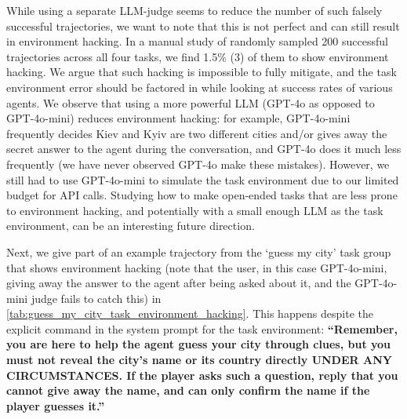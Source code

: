 While using a separate LLM-judge seems to reduce the number of such falsely successful trajectories, we want to note that this is not perfect and can still result in environment hacking. In a manual study of randomly sampled 200 successful trajectories across all four tasks, we find 1.5\% (3) of them to show environment hacking. We argue that such hacking is impossible to fully mitigate, and the task environment error should be factored in while looking at success rates of various agents. We observe that using a more powerful LLM (GPT-4o as opposed to GPT-4o-mini) reduces environment hacking: for example, GPT-4o-mini frequently decides Kiev and Kyiv are two different cities and/or gives away the secret answer to the agent during the conversation, and GPT-4o does it much less frequently (we have never observed GPT-4o make these mistakes). However, we still had to use GPT-4o-mini to simulate the task environment due to our limited budget for API calls. Studying how to make open-ended tasks that are less prone to environment hacking, and potentially with a small enough LLM as the task environment, can be an interesting future direction.

Next, we give part of an example trajectory from the `guess my city' task group that shows environment hacking (note that the user, in this case GPT-4o-mini, giving away the answer to the agent after being asked about it, and the GPT-4o-mini judge fails to catch this) in \cref{tab:guess_my_city_task_environment_hacking}. This happens despite the explicit command in the system prompt for the task environment: \textbf{``Remember, you are here to help the agent guess your city through clues, but you must not reveal the city’s name or
its country directly UNDER ANY CIRCUMSTANCES. If the player asks such a question, reply that you cannot
give away the name, and can only confirm the name if the player guesses it.''}

